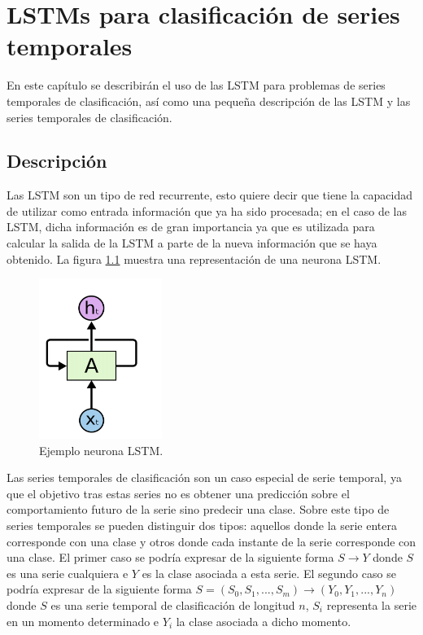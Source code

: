 \chapter{LSTMs para clasificación de series temporales}
En este capítulo se describirán el uso de las LSTM para problemas de series temporales de clasificación, así como una pequeña descripción de las LSTM y las series temporales de clasificación.
\section{Descripción}
Las LSTM son un tipo de red recurrente, esto quiere decir que tiene la capacidad de utilizar como entrada información que ya ha sido procesada; en el caso de las LSTM, dicha información es de gran importancia ya que es utilizada para calcular la salida de la LSTM a parte de la nueva información que se haya obtenido. La figura \ref{fig:31} muestra una representación de una neurona LSTM.\newline

\begin{figure}[H]
	\centering
	\includegraphics[width=40mm]{imagenes/lstm_basico.png}
	\caption{Ejemplo neurona LSTM.}
	\label{fig:31}
\end{figure}
\verticalspace

Las series temporales de clasificación son un caso especial de serie temporal, ya que el objetivo tras estas series no es obtener una predicción sobre el comportamiento futuro de la serie sino predecir una clase. Sobre este tipo de series temporales se pueden distinguir dos tipos: aquellos donde la serie entera corresponde con una clase y otros donde cada instante de la serie corresponde con una clase. El primer caso se podría expresar de la siguiente forma $ S \rightarrow Y $ donde $S$  es una serie cualquiera e $Y$ es la clase asociada a esta serie. El segundo caso se podría expresar de la siguiente forma $ S = (S_0, S_1,..., S_m) \rightarrow (Y_0,Y_1,..., Y_n) $ donde $S$ es una serie temporal de clasificación de longitud $n$, $S_i$ representa la serie en un momento determinado e $Y_i$ la clase asociada a dicho momento.\newline

